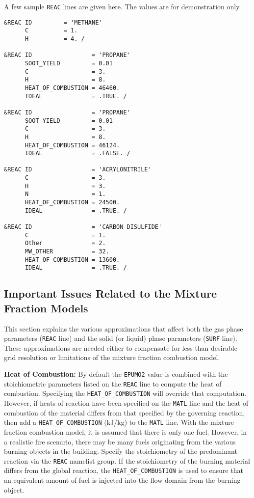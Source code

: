 \documentclass[11pt]{book}
\newcommand{\ct}{\tt\small}
\begin{document}
\noindent
A few sample {\ct REAC} lines are given here. The values are for demonstration only.


\footnotesize
\begin{verbatim}
&REAC ID         = 'METHANE'
      C          = 1.
      H          = 4. /

&REAC ID                 = 'PROPANE'
      SOOT_YIELD         = 0.01
      C                  = 3.
      H                  = 8.
      HEAT_OF_COMBUSTION = 46460.
      IDEAL              = .TRUE. /

&REAC ID                 = 'PROPANE'
      SOOT_YIELD         = 0.01
      C                  = 3.
      H                  = 8.
      HEAT_OF_COMBUSTION = 46124.
      IDEAL              = .FALSE. /

&REAC ID                 = 'ACRYLONITRILE'
      C                  = 3.
      H                  = 3.
      N                  = 1.
      HEAT_OF_COMBUSTION = 24500.
      IDEAL              = .TRUE. /

&REAC ID                 = 'CARBON DISULFIDE'
      C                  = 1.
      Other              = 2.
      MW_OTHER           = 32.
      HEAT_OF_COMBUSTION = 13600.
      IDEAL              = .TRUE. /
\end{verbatim}
\normalsize



\subsection{Important Issues Related to the Mixture Fraction Models}
\label{info:combustion}

This section explains the various approximations that
affect both the gas phase parameters ({\ct REAC} line) and the
solid (or liquid) phase parameters ({\ct SURF} line). These
approximations are needed either to compensate for less than
desirable grid resolution or limitations of the mixture fraction
combustion model.


\vspace{\baselineskip}
\noindent
{\bf Heat of Combustion:} By default the {\ct EPUMO2} value is combined with
the stoichiometric parameters listed
on the {\ct REAC} line to compute the heat of combustion.  Specifying the
{\ct HEAT\_OF\_COMBUSTION} will override that computation.
However, if heats of reaction have been specified on the
{\ct MATL} line and
the heat of combustion of the material differs from that specified by
the governing reaction, then add a
{\ct HEAT\_OF\_COMBUSTION} (kJ/kg) to the {\ct MATL} line.
With the mixture fraction combustion
model, it is assumed that there is only one fuel. However, in a realistic
fire scenario, there may be many fuels originating from the various
burning objects in the building. Specify
the stoichiometry of the predominant reaction via the {\ct REAC}
namelist group. If the stoichiometry of the burning material
differs from the global reaction, the {\ct HEAT\_OF\_COMBUSTION} is
used to ensure that an equivalent amount of fuel is injected into the
flow domain from the burning object.
\end{document}
